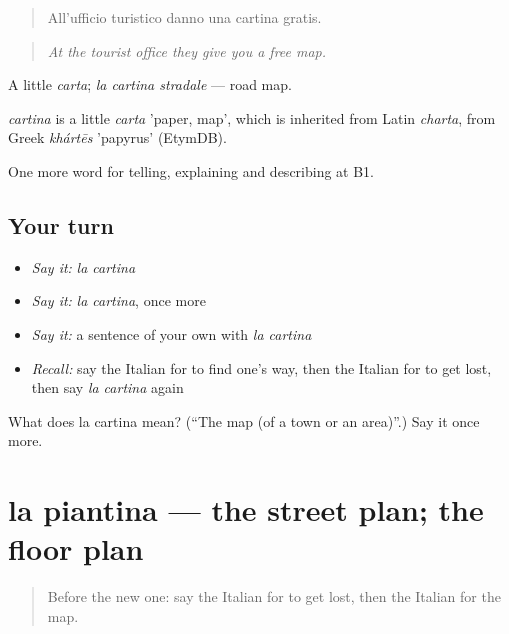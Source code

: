 \begin{quote}
All'ufficio turistico danno una cartina gratis.
\end{quote}

\begin{quote}
\emph{At the tourist office they give you a free map.}
\end{quote}

A little \emph{carta}; \emph{la cartina stradale} — road map.

\begin{cousinweb}
\emph{cartina} is a little \emph{carta} 'paper, map', which is inherited from Latin \emph{charta}, from Greek \emph{khártēs} 'papyrus' (EtymDB).
\end{cousinweb}

\begin{grammarlens}[title={What you've built}]
One more word for telling, explaining and describing at B1.
\end{grammarlens}

\subsection*{Your turn}
\begin{itemize}
\raggedright
  \item \emph{Say it:} \emph{la cartina}
  \item \emph{Say it:} \emph{la cartina}, once more
  \item \emph{Say it:} a sentence of your own with \emph{la cartina}
  \item \emph{Recall:} say the Italian for to find one's way, then the Italian for to get lost, then say \emph{la cartina} again
\end{itemize}

\begin{tcolorbox}[breakable,colback=teal!4,colframe=teal!35!black,title={Before you move on}]
What does la cartina mean? (\textquotedblleft{}The map (of a town or an area)\textquotedblright{}.) Say it once more.
\end{tcolorbox}
\section[la piantina]{la piantina — the street plan; the floor plan}

\label{lesson:IT-C439-piantina}



\begin{quote}
Before the new one: say the Italian for to get lost, then the Italian for the map.
\end{quote}

